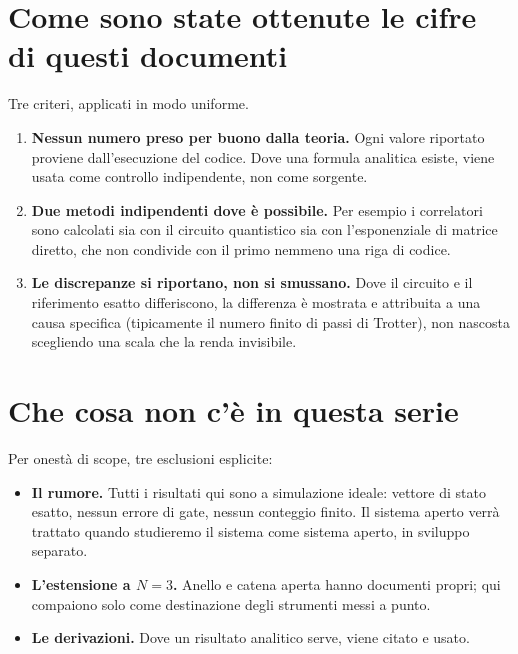 \documentclass[11pt,a4paper]{article}
\begin{document}
\FloatBarrier

\section{Come sono state ottenute le cifre di questi documenti}

Tre criteri, applicati in modo uniforme.

\begin{enumerate}[leftmargin=1.5em,itemsep=3pt]
\item \textbf{Nessun numero preso per buono dalla teoria.} Ogni valore riportato
proviene dall'esecuzione del codice. Dove una formula analitica esiste, viene
usata come controllo indipendente, non come sorgente.

\item \textbf{Due metodi indipendenti dove è possibile.} Per esempio i
correlatori sono calcolati sia con il circuito quantistico sia con
l'esponenziale di matrice diretto, che non condivide con il primo nemmeno una
riga di codice.

\item \textbf{Le discrepanze si riportano, non si smussano.} Dove il circuito e
il riferimento esatto differiscono, la differenza è mostrata e attribuita a una
causa specifica (tipicamente il numero finito di passi di Trotter), non
nascosta scegliendo una scala che la renda invisibile.
\end{enumerate}


\section{Che cosa non c'è in questa serie}

Per onestà di scope, tre esclusioni esplicite:

\begin{itemize}[leftmargin=1.5em,itemsep=2pt]
\item \textbf{Il rumore.} Tutti i risultati qui sono a simulazione ideale:
vettore di stato esatto, nessun errore di gate, nessun conteggio finito. Il
sistema aperto verrà trattato quando studieremo il sistema come sistema
aperto, in sviluppo separato.
\item \textbf{L'estensione a $N=3$.} Anello e catena aperta hanno documenti
propri; qui compaiono solo come destinazione degli strumenti messi a punto.
\item \textbf{Le derivazioni.} Dove un risultato analitico serve, viene citato e
usato.
\end{itemize}
\end{document}
